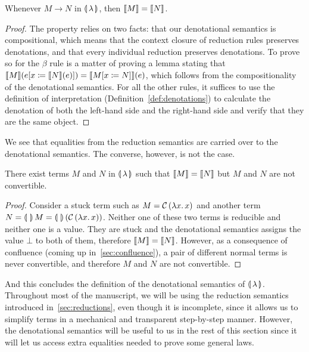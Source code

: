 \begin{property}\label{prop:denotation-soundness}

  Whenever $M \to N$ in $\llparenthesis \, \lambda \, \rrparenthesis$, then $\llbracket M \rrbracket = \llbracket N \rrbracket$.
\end{property}

\begin{proof}
  The property relies on two facts: that our denotational semantics is
  compositional, which means that the context closure of reduction rules
  preserves denotations, and that every individual reduction preserves
  denotations. To prove so for the $\beta$ rule is a matter of proving a
  lemma stating that
  $\llbracket M \rrbracket(e[x \coloneqq \llbracket N \rrbracket(e)]) = \llbracket M[x \coloneqq N] \rrbracket(e)$, which
  follows from the compositionality of the denotational semantics. For all
  the other rules, it suffices to use the definition of interpretation
  (Definition~\ref{def:denotations}) to calculate the denotation of both
  the left-hand side and the right-hand side and verify that they are the
  same object.
\end{proof}

We see that equalities from the reduction semantics are carried over to the
denotational semantics. The converse, however, is not the case.

\begin{observation}
  
  There exist terms $M$ and $N$ in $\llparenthesis \, \lambda \, \rrparenthesis$ such that
  $\llbracket M \rrbracket = \llbracket N \rrbracket$ but $M$ and $N$ are not convertible.
\end{observation}

\begin{proof}
  Consider a stuck term such as $M = \mathcal{C}\,(\lambda x.\, x)$ and another
  term $N = \llparenthesis \,  \, \rrparenthesis\,M =
  \llparenthesis \,  \, \rrparenthesis\,(\mathcal{C}\,(\lambda x.\, x))$. Neither one of these two terms
  is reducible and neither one is a value. They are stuck and the
  denotational semantics assigns the value $\bot$ to both of them,
  therefore $\llbracket M \rrbracket = \llbracket N \rrbracket$. However, as a consequence of confluence
  (coming up in~\ref{sec:confluence}), a pair of different normal terms is
  never convertible, and therefore $M$ and $N$ are not convertible.
\end{proof}

And this concludes the definition of the denotational semantics of
$\llparenthesis \, \lambda \, \rrparenthesis$. Throughout most of the manuscript, we will be using the
reduction semantics introduced in~\ref{sec:reductions}, even though it is
incomplete, since it allows us to simplify terms in a mechanical and
transparent step-by-step manner. However, the denotational semantics will
be useful to us in the rest of this section since it will let us access
extra equalities needed to prove some general laws.


